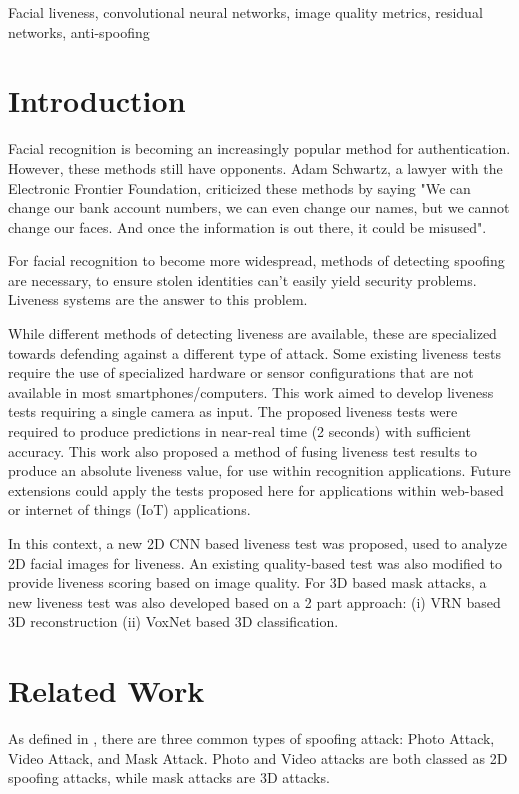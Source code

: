 \documentclass[10pt,a4paper]{article}
\begin{document}
\begin{keywords}
Facial liveness, convolutional neural networks, image quality metrics, residual networks, anti-spoofing
\end{keywords}

\section{Introduction}
    Facial recognition is becoming an increasingly popular method for authentication. However, these methods still have opponents. Adam Schwartz, a lawyer with the Electronic Frontier Foundation,  criticized these methods by saying "We can change our bank account numbers, we can even change our names, but we cannot change our faces.
    And once the information is out there, it could be misused". \cite{NPRArticle}

    For facial recognition to become more widespread, methods of detecting spoofing are necessary, to ensure stolen identities can't easily yield security problems. Liveness systems are the answer to this problem. 

    While different methods of detecting liveness are available, these are specialized towards defending against a different type of attack.
    Some existing liveness tests require the use of specialized hardware or sensor configurations that are not available in most smartphones/computers. 
    This work aimed to develop liveness tests requiring a single camera as input. The proposed liveness tests were required to produce predictions in near-real time (2 seconds) with sufficient accuracy.
    This work also proposed a method of fusing liveness test results to produce an absolute liveness value, for use within recognition applications.
    Future extensions could apply the tests proposed here for applications within web-based or internet of things (IoT) applications. 

    In this context, a new 2D CNN based liveness test was proposed, used to analyze 2D facial images for liveness. An existing quality-based test was also modified to provide liveness scoring based on image quality. For 3D based mask attacks, a new liveness test was also developed based on a 2 part approach: (i) VRN based 3D reconstruction (ii) VoxNet based 3D classification.

\section{Related Work}
    As defined in \cite{FaceSpoofingAttacksStudy}, there are three common types of spoofing attack: Photo Attack, Video Attack, and Mask Attack.
    Photo and Video attacks are both classed as 2D spoofing attacks, while mask attacks are 3D attacks.
\end{document}

